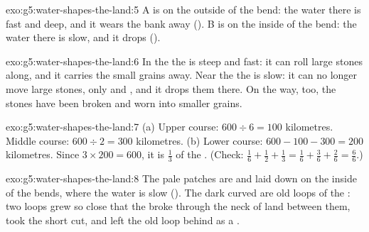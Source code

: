 \begin{solution}{exo:g5:water-shapes-the-land:5}
A is on the outside of the bend: the water there is fast and deep, and it
wears the bank away (). B is on the inside of the bend: the water
there is slow, and it drops  ().
\end{solution}

\begin{solution}{exo:g5:water-shapes-the-land:6}
In the  the  is steep and fast: it can roll large stones
along, and it carries the small grains away. Near the  the  is slow:
it can no longer move large stones, only  and , and it drops them
there. On the way, too, the stones have been broken and worn into smaller
grains.
\end{solution}

\begin{solution}{exo:g5:water-shapes-the-land:7}
(a) Upper course: $600 \div 6 = 100$ kilometres. Middle course:
$600 \div 2 = 300$ kilometres. (b) Lower course: $600 - 100 - 300 = 200$
kilometres. Since $3 \times 200 = 600$, it is $\frac{1}{3}$ of the .
(Check: $\frac{1}{6} + \frac{1}{2} + \frac{1}{3} = \frac{1}{6} +
\frac{3}{6} + \frac{2}{6} = \frac{6}{6}$.)
\end{solution}

\begin{solution}{exo:g5:water-shapes-the-land:8}
The pale patches are  and  laid down on the inside of the bends,
where the water is slow (). The dark curved  are old loops
of the : two loops grew so close that the  broke through the neck
of land between them, took the short cut, and left the old loop behind as
a .
\end{solution}

